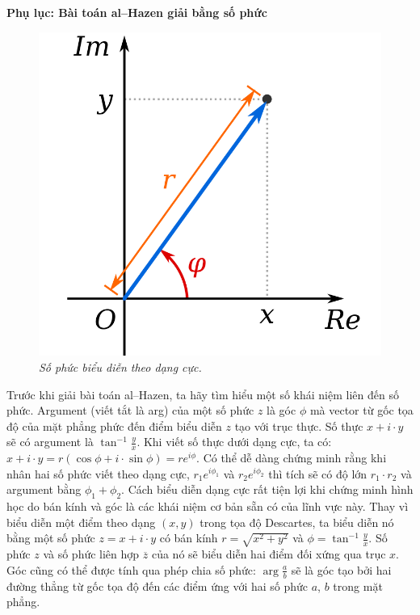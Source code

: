 \begin{multicols}{2}
\begin{figure}[H]
		\vspace*{-5pt}
	\end{figure}
	\textbf{\color{lichsutoanhoc}Phụ lục: Bài toán al--Hazen giải bằng số phức}
	\begin{figure}[H]
		\vspace*{-5pt}
		\centering
		\captionsetup{labelformat= empty, justification=centering}
		\includegraphics[width= 0.75\linewidth]{12}
		\caption{\small\textit{\color{lichsutoanhoc}Số phức biểu diễn theo dạng cực.}}
		\vspace*{-10pt}
	\end{figure}
	Trước khi giải bài toán al--Hazen, ta hãy tìm hiểu một số khái niệm liên đến số phức. Argument (viết tắt là arg) của một số phức $z$ là góc $\phi$ mà vector từ gốc tọa độ của mặt phẳng phức đến điểm biểu diễn $z$ tạo với trục thực. Số thực $x+i\cdot y$ sẽ có argument là $\tan^{-1}\frac{y}{x}$. Khi viết số thực dưới dạng cực, ta có: $x+i\cdot y=r(\cos\phi+i\cdot \sin\phi)=re^{i\phi}$.
	\vskip 0.1cm 
	Có thể dễ dàng chứng minh rằng khi nhân hai số phức viết theo dạng cực, $r_1 e^{i\phi_1}$ và $r_2 e^{i\phi_2}$ thì tích sẽ có độ lớn $r_1\cdot r_2$ và argument bằng $\phi_1 + \phi_2$. Cách biểu diễn dạng cực rất tiện lợi khi chứng minh hình học do bán kính và góc là các khái niệm cơ bản sẵn có của lĩnh vực này. Thay vì biểu diễn một điểm theo dạng $(x,y)$ trong tọa độ Descartes, ta biểu diễn nó bằng một số phức $z=x+i\cdot y$ có bán kính $r=\sqrt{x^2 + y^2}$ và $\phi = \tan^{-1}\frac{y}{x}$. Số phức $z$ và số phức liên hợp $\overline{z}$ của nó sẽ biểu diễn hai điểm đối xứng qua trục $x$. Góc cũng có thể được tính qua phép chia số phức: $\arg\frac{a}{b}$ sẽ là góc tạo bởi hai đường thẳng từ gốc tọa độ đến các điểm ứng với hai số phức $a$, $b$ trong mặt phẳng.

\end{multicols}
